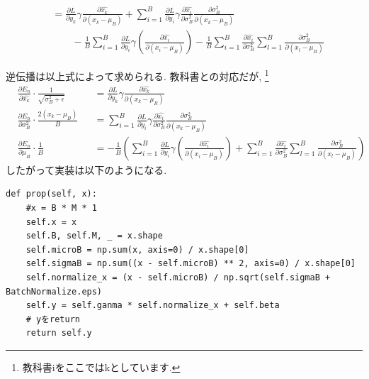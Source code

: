 \documentclass[a4paper,11pt]{jsarticle}
\begin{document}
\begin{align*}
                                  & = \frac{\partial L}{\partial y_k}\gamma\frac{\partial \hat{x_k}}{\partial (x_k - \mu_B)} + \sum_{i=1}^{B}\frac{\partial L}{\partial y_i}\gamma\frac{\partial \hat{x_i}}{\partial \sigma_B^2}\frac{\partial \sigma_B^2}{\partial (x_k - \mu_B)}                                                                                                            \\ & \qquad - \frac{1}{B}\sum_{i=1}^{B}\frac{\partial L}{\partial y_i}\gamma(\frac{\partial \hat{x_i}}{\partial (x_i - \mu_B)})
  - \frac{1}{B}\sum_{i=1}^{B}\frac{\partial \hat{x_i}}{\partial \sigma_B^2}\sum_{l=1}^{B}\frac{\partial \sigma_B^2}{\partial (x_l - \mu_B)}
\end{align*}

逆伝播は以上式によって求められる.
教科書との対応だが, \footnote{教科書iをここではkとしています.}
\begin{align*}
   & \frac{\partial E_n}{\partial \hat{x_k}} \cdot \frac{1}{\sqrt{\sigma_B^2 + \epsilon}} &  & = \frac{\partial L}{\partial y_k}\gamma\frac{\partial \hat{x_k}}{\partial (x_k - \mu_B)} \\
   & \frac{\partial E_n}{\partial \sigma_B^2} \cdot \frac{2(x_k - \mu_B)}{B}              &  & =
  \sum_{i=1}^{B}\frac{\partial L}{\partial y_i}\gamma\frac{\partial \hat{x_i}}{\partial \sigma_B^2}\frac{\partial \sigma_B^2}{\partial (x_k - \mu_B)}                                   \\
   & \frac{\partial E_n}{\partial \mu_B} \cdot \frac{1}{B}                                &  & =
  - \frac{1}{B}\left(
  \sum_{i=1}^{B}\frac{\partial L}{\partial y_i}\gamma(\frac{\partial \hat{x_i}}{\partial (x_i - \mu_B)})
  + \sum_{i=1}^{B}\frac{\partial \hat{x_i}}{\partial \sigma_B^2}\sum_{l=1}^{B}\frac{\partial \sigma_B^2}{\partial (x_l - \mu_B)}
  \right)
\end{align*}
したがって実装は以下のようになる.
\begin{lstlisting}[caption=Batch-Normalization-prop]
  def prop(self, x):
    #x = B * M * 1
    self.x = x
    self.B, self.M, _ = x.shape
    self.microB = np.sum(x, axis=0) / x.shape[0]
    self.sigmaB = np.sum((x - self.microB) ** 2, axis=0) / x.shape[0]
    self.normalize_x = (x - self.microB) / np.sqrt(self.sigmaB + BatchNormalize.eps)
    self.y = self.ganma * self.normalize_x + self.beta
    # yをreturn
    return self.y
\end{lstlisting}
\end{document}
